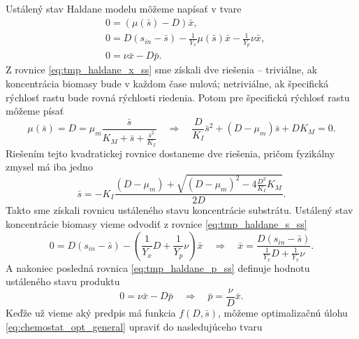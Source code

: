 Ustálený stav Haldane modelu môžeme napísať v tvare
\begin{align}
	&0 = \left(\mu(\bar{s}) - D\right)\bar{x}, \label{eq:tmp_haldane_x_ss}\\
	&0 = D\left(s_{in} - \bar{s}\right) - \frac{1}{Y_{x}}\mu(\bar{s})\bar{x} - \frac{1}{Y_{p}}\nu \bar{x}, \label{eq:tmp_haldane_s_ss}\\
	&0 = \nu \bar{x} - D\bar{p} \label{eq:tmp_haldane_p_ss}.
\end{align}
Z rovnice \eqref{eq:tmp_haldane_x_ss} sme získali dve riešenia -- triviálne, ak koncentrácia biomasy bude v každom čase nulová; netriviálne, ak špecifická rýchlosť rastu bude rovná rýchlosti riedenia. Potom pre špecifickú rýchlosť rastu môžeme písať 
\begin{equation}
	\mu(\bar{s}) = D = \mu_{m}\frac{\bar{s}}{K_{M} + \bar{s} + \frac{\bar{s}^2}{K_{I}}} \quad \Longrightarrow \quad
	\frac{D}{K_{I}}\bar{s}^2 + (D-\mu_{m})\bar{s} + DK_{M} = 0.
\end{equation}
Riešením tejto kvadratickej rovnice dostaneme dve riešenia, pričom fyzikálny zmysel má iba jedno
\begin{equation}
	\label{eq:haldane_subs_ss}
	\bar{s} = -K_{I}\frac{\left(D-\mu_{m}\right) + \sqrt{\left(D-\mu_{m}\right)^2 - 4\frac{D^2}{K_{I}}K_{M}}}{2D}. 
\end{equation}
Takto sme získali rovnicu ustáleného stavu koncentrácie substrátu. Ustálený stav koncentrácie biomasy vieme odvodiť z rovnice \eqref{eq:tmp_haldane_s_ss}
\begin{equation}
\label{eq:haldane_biomass_ss}
	0 = D\left(s_{in}-\bar{s}\right) - \left(\frac{1}{Y_{x}}D + \frac{1}{Y_{p}}\nu\right)\bar{x} \quad \Longrightarrow \quad
	\bar{x} = \frac{D\left(s_{in}-\bar{s}\right)}{\frac{1}{Y_{x}}D + \frac{1}{Y_{x}}\nu}. 
\end{equation}
A nakoniec posledná rovnica \eqref{eq:tmp_haldane_p_ss} definuje hodnotu ustáleného stavu produktu
\begin{equation}
\label{eq:haldane_product_ss}
	0 = \nu \bar{x} - D\bar{p} \quad \Longrightarrow \quad \bar{p} = \frac{\nu}{D}\bar{x}.
\end{equation}
Keďže už vieme aký predpis má funkcia $ f(D,\bar{s}) $, môžeme optimalizačnú úlohu \eqref{eq:chemostat_opt_general} upraviť do nasledujúceho tvaru 
